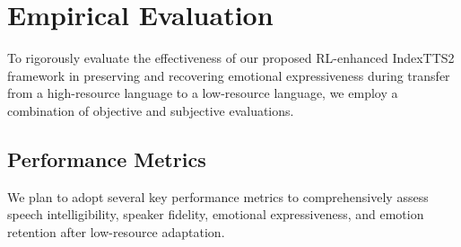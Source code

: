 \section{Empirical Evaluation}
\label{section:evaluation}
To rigorously evaluate the effectiveness of our proposed RL-enhanced IndexTTS2 framework in preserving and recovering emotional expressiveness during transfer from a high-resource language to a low-resource language, we employ a combination of objective and subjective evaluations.

\subsection{Performance Metrics}
We plan to adopt several key performance metrics to comprehensively assess speech intelligibility, speaker fidelity, emotional expressiveness, and emotion retention after low-resource adaptation.
